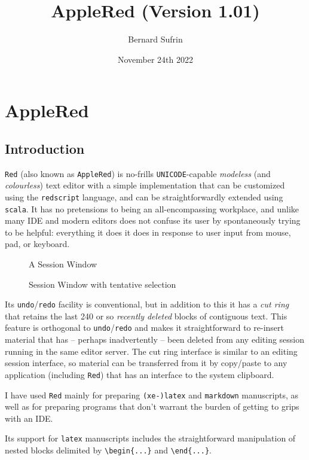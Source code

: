\documentclass[11pt,a4paper]{article}
\title{AppleRed (Version 1.01)}
\author{Bernard Sufrin}
\date{November 24th 2022}
\newcommand{\Screen}[2][height=4in]{
 \begin{center}
  \pdffig[#1]{pdf/#2}
   \end{center}}
\newcommand{\ScreenFigHere}[2]{
\begin{figure}[h]
\Screen[width=3.5in]{#2}
\caption{#1}\label{#2}
\end{figure}
}
\begin{document}
\maketitle

\hypertarget{applered}{\section{AppleRed}\label{applered}}


\hypertarget{introduction}{\subsection{Introduction}\label{introduction}}

\texttt{Red} (also known as \texttt{AppleRed}) is no-frills
\texttt{UNICODE}-capable \emph{modeless} (and \emph{colourless}) text
editor with a simple implementation that can be customized using the
\texttt{redscript} language, and can be straightforwardly extended using
\texttt{scala}. It has no pretensions to being an all-encompassing
workplace, and unlike many IDE and modern editors does not confuse its
user by spontaneously trying to be helpful: everything it does it does
in response to user input from mouse, pad, or keyboard.

\ScreenFigHere{A Session Window}{Screen1}
\ScreenFigHere{Session Window with tentative selection}{Screen2}

Its \texttt{undo}/\texttt{redo} facility is conventional, but in
addition to this it has a \emph{cut ring} that retains the last 240 or
so \emph{recently deleted} blocks of contiguous text. This feature is
orthogonal to \texttt{undo}/\texttt{redo} and makes it straightforward
to re-insert material that has -- perhaps inadvertently -- been deleted
from any editing session running in the same editor server. The cut ring
interface is similar to an editing session interface, so material can be
transferred from it by copy/paste to any application (including
\texttt{Red}) that has an interface to the system clipboard.

I have used \texttt{Red} mainly for preparing \texttt{(xe-)latex} and
\texttt{markdown} manuscripts, as well as for preparing programs that
don't warrant the burden of getting to grips with an IDE.


Its support for \texttt{latex} manuscripts includes the straightforward
manipulation of nested blocks delimited by
\texttt{\textbackslash{}begin\{...\}} and
\texttt{\textbackslash{}end\{...\}}.
\end{document}
